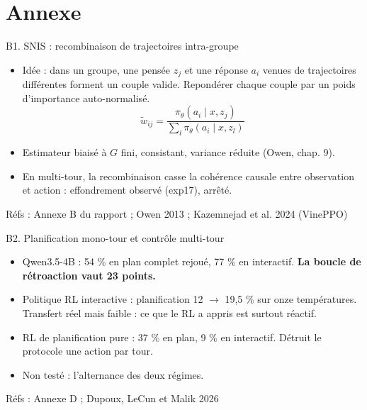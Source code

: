 \documentclass[aspectratio=169,10pt]{beamer}
\newif\ifinappendix
\newcommand{\refs}[1]{\vfill{\tiny\textcolor{crMid}{Réfs : #1}}}
\newcommand{\hl}[1]{\textcolor{crOrange}{\textbf{#1}}}
\begin{document}
\appendix
\inappendixtrue
\section{Annexe}

\begin{frame}{B1. SNIS : recombinaison de trajectoires intra-groupe}
\begin{itemize}
  \item Idée : dans un groupe, une pensée $z_j$ et une réponse $a_i$ venues de trajectoires différentes forment un couple valide. Repondérer chaque couple par un poids d'importance auto-normalisé.
  \[ \tilde w_{ij} = \frac{\pi_\theta(a_i \mid x, z_j)}{\sum_{l} \pi_\theta(a_i \mid x, z_l)} \]
  \item Estimateur biaisé à $G$ fini, consistant, variance réduite (Owen, chap. 9).
  \item En multi-tour, la recombinaison casse la cohérence causale entre observation et action : effondrement observé (exp17), arrêté.
\end{itemize}
\refs{Annexe B du rapport ; Owen 2013 ; Kazemnejad et al. 2024 (VinePPO)}
\end{frame}

\begin{frame}{B2. Planification mono-tour et contrôle multi-tour}
\begin{itemize}
  \item Qwen3.5-4B : 54 \% en plan complet rejoué, 77 \% en interactif. \hl{La boucle de rétroaction vaut 23 points.}
  \item Politique RL interactive : planification 12 $\to$ 19,5 \% sur onze températures. Transfert réel mais faible : ce que le RL a appris est surtout réactif.
  \item RL de planification pure : 37 \% en plan, 9 \% en interactif. Détruit le protocole une action par tour.
  \item Non testé : l'alternance des deux régimes.
\end{itemize}
\refs{Annexe D ; Dupoux, LeCun et Malik 2026}
\end{frame}
\end{document}
